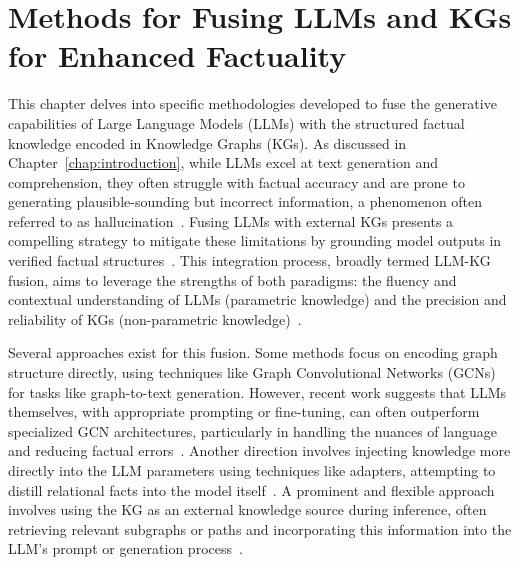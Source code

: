 \chapter{Methods for Fusing LLMs and KGs for Enhanced Factuality}
\label{chap:methods}


This chapter delves into specific methodologies developed to fuse the generative capabilities of Large Language Models (LLMs) with the structured factual knowledge encoded in Knowledge Graphs (KGs). As discussed in Chapter~\ref{chap:introduction}, while LLMs excel at text generation and comprehension, they often struggle with factual accuracy and are prone to generating plausible-sounding but incorrect information, a phenomenon often referred to as hallucination~\cite{lin-etal-2022-truthfulqa, DBLP:conf/emnlp/RobertsRS20}. Fusing LLMs with external KGs presents a compelling strategy to mitigate these limitations by grounding model outputs in verified factual structures~\cite{DBLP:journals/tkde/PanLWCWW24}. This integration process, broadly termed LLM-KG fusion, aims to leverage the strengths of both paradigms: the fluency and contextual understanding of LLMs (parametric knowledge) and the precision and reliability of KGs (non-parametric knowledge)~\cite{DBLP:conf/acl/MallenAZDKH23}.

Several approaches exist for this fusion. Some methods focus on encoding graph structure directly, using techniques like Graph Convolutional Networks (GCNs) for tasks like graph-to-text generation. However, recent work suggests that LLMs themselves, with appropriate prompting or fine-tuning, can often outperform specialized GCN architectures, particularly in handling the nuances of language and reducing factual errors~\cite{iarosh-etal-2025-reducing, DBLP:conf/ijcai/0001LW0S0Y24}. Another direction involves injecting knowledge more directly into the LLM parameters using techniques like adapters, attempting to distill relational facts into the model itself~\cite{DBLP:journals/corr/abs-2002-01808}. A prominent and flexible approach involves using the KG as an external knowledge source during inference, often retrieving relevant subgraphs or paths and incorporating this information into the LLM's prompt or generation process~\cite{DBLP:conf/emnlp/KnowledgeAugmented}.

